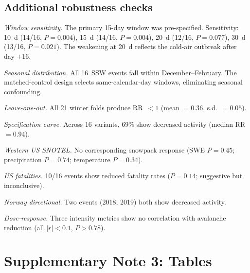 \documentclass[11pt,letterpaper]{article}
\begin{document}
\subsection{Additional robustness checks}

\textit{Window sensitivity.} The primary 15-day window was pre-specified. Sensitivity: 10~d (14/16, $P = 0.004$), 15~d (14/16, $P = 0.004$), 20~d (12/16, $P = 0.077$), 30~d (13/16, $P = 0.021$). The weakening at 20~d reflects the cold-air outbreak after day $+16$.

\textit{Seasonal distribution.} All 16~SSW events fall within December--February. The matched-control design selects same-calendar-day windows, eliminating seasonal confounding.

\textit{Leave-one-out.} All 21 winter folds produce RR~$< 1$ (mean $= 0.36$, s.d.~$= 0.05$).

\textit{Specification curve.} Across 16 variants, 69\% show decreased activity (median RR~$= 0.94$).

\textit{Western US SNOTEL.} No corresponding snowpack response (SWE $P = 0.45$; precipitation $P = 0.74$; temperature $P = 0.34$).

\textit{US fatalities.} 10/16 events show reduced fatality rates ($P = 0.14$; suggestive but inconclusive).

\textit{Norway directional.} Two events (2018, 2019) both show decreased activity.

\textit{Dose-response.} Three intensity metrics show no correlation with avalanche reduction (all $|r| < 0.1$, $P > 0.78$).

\section{Supplementary Note 3: Tables}
\end{document}
